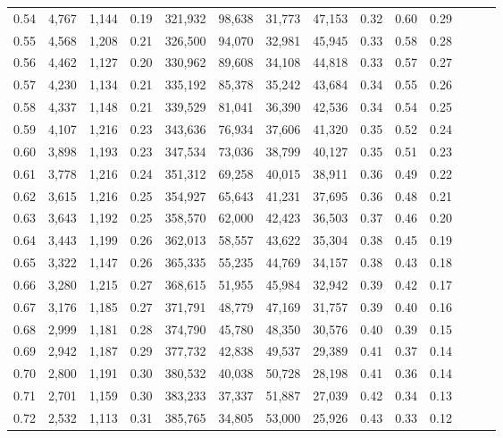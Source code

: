 \begin{tabular}{rrrrrrrrrrrrrr}
0.54 &  4,767 &  1,144 &  0.19 &  321,932 &   98,638 &  31,773 &  47,153 &  0.32 &  0.60 &      0.29 \\
0.55 &  4,568 &  1,208 &  0.21 &  326,500 &   94,070 &  32,981 &  45,945 &  0.33 &  0.58 &      0.28 \\
0.56 &  4,462 &  1,127 &  0.20 &  330,962 &   89,608 &  34,108 &  44,818 &  0.33 &  0.57 &      0.27 \\
0.57 &  4,230 &  1,134 &  0.21 &  335,192 &   85,378 &  35,242 &  43,684 &  0.34 &  0.55 &      0.26 \\
0.58 &  4,337 &  1,148 &  0.21 &  339,529 &   81,041 &  36,390 &  42,536 &  0.34 &  0.54 &      0.25 \\
0.59 &  4,107 &  1,216 &  0.23 &  343,636 &   76,934 &  37,606 &  41,320 &  0.35 &  0.52 &      0.24 \\
0.60 &  3,898 &  1,193 &  0.23 &  347,534 &   73,036 &  38,799 &  40,127 &  0.35 &  0.51 &      0.23 \\
0.61 &  3,778 &  1,216 &  0.24 &  351,312 &   69,258 &  40,015 &  38,911 &  0.36 &  0.49 &      0.22 \\
0.62 &  3,615 &  1,216 &  0.25 &  354,927 &   65,643 &  41,231 &  37,695 &  0.36 &  0.48 &      0.21 \\
0.63 &  3,643 &  1,192 &  0.25 &  358,570 &   62,000 &  42,423 &  36,503 &  0.37 &  0.46 &      0.20 \\
0.64 &  3,443 &  1,199 &  0.26 &  362,013 &   58,557 &  43,622 &  35,304 &  0.38 &  0.45 &      0.19 \\
0.65 &  3,322 &  1,147 &  0.26 &  365,335 &   55,235 &  44,769 &  34,157 &  0.38 &  0.43 &      0.18 \\
0.66 &  3,280 &  1,215 &  0.27 &  368,615 &   51,955 &  45,984 &  32,942 &  0.39 &  0.42 &      0.17 \\
0.67 &  3,176 &  1,185 &  0.27 &  371,791 &   48,779 &  47,169 &  31,757 &  0.39 &  0.40 &      0.16 \\
0.68 &  2,999 &  1,181 &  0.28 &  374,790 &   45,780 &  48,350 &  30,576 &  0.40 &  0.39 &      0.15 \\
0.69 &  2,942 &  1,187 &  0.29 &  377,732 &   42,838 &  49,537 &  29,389 &  0.41 &  0.37 &      0.14 \\
0.70 &  2,800 &  1,191 &  0.30 &  380,532 &   40,038 &  50,728 &  28,198 &  0.41 &  0.36 &      0.14 \\
0.71 &  2,701 &  1,159 &  0.30 &  383,233 &   37,337 &  51,887 &  27,039 &  0.42 &  0.34 &      0.13 \\
0.72 &  2,532 &  1,113 &  0.31 &  385,765 &   34,805 &  53,000 &  25,926 &  0.43 &  0.33 &      0.12 \\

\end{tabular}
